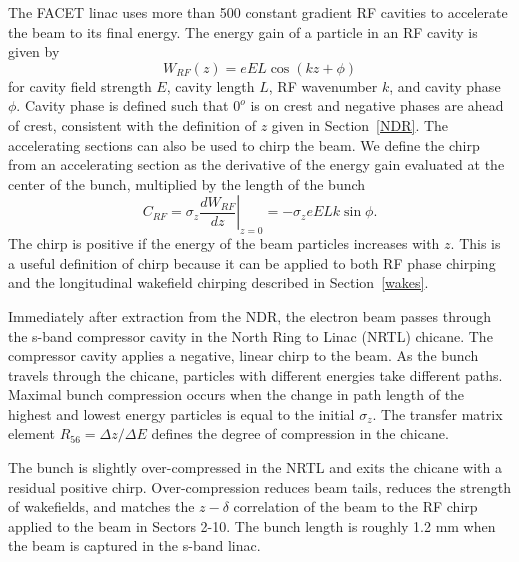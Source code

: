 \documentclass[%
twocolumn,
showpacs,preprintnumbers,
 aps,
prstab,
]{revtex4-1}
\begin{document}
The FACET linac uses more than 500 constant gradient RF cavities to accelerate the beam to its final energy. The energy gain of a particle in an RF cavity is given by
\begin{equation}
W_{RF}(z) = e E L \cos(kz + \phi)
\end{equation}
for cavity field strength $E$, cavity length $L$, RF wavenumber $k$, and cavity phase $\phi$. Cavity phase is defined such that $0^o$ is on crest and negative phases are ahead of crest, consistent with the definition of $z$ given in Section~\ref{NDR}. The accelerating sections can also be used to chirp the beam. We define the chirp from an accelerating section as the derivative of the energy gain evaluated at the center of the bunch, multiplied by the length of the bunch
\begin{equation}
C_{RF} = \sigma_z \left. \frac{dW_{RF}}{dz} \right|_{z=0} = -\sigma_z e E L k \sin{\phi}.
\end{equation}
The chirp is positive if the energy of the beam particles increases with $z$. This is a useful definition of chirp because it can be applied to both RF phase chirping and the longitudinal wakefield chirping described in Section~\ref{wakes}.

Immediately after extraction from the NDR, the electron beam passes through the s-band compressor cavity in the North Ring to Linac (NRTL) chicane. The compressor cavity applies a negative, linear chirp to the beam. As the bunch travels through the chicane, particles with different energies take different paths. Maximal bunch compression occurs when the change in path length of the highest and lowest energy particles is equal to the initial $\sigma_z$. The transfer matrix element $R_{56} = \Delta z/\Delta E$ defines the degree of compression in the chicane.

The bunch is slightly over-compressed in the NRTL and exits the chicane with a residual positive chirp. Over-compression reduces beam tails, reduces the strength of wakefields, and matches the $z-\delta$ correlation of the beam to the RF chirp applied to the beam in Sectors 2-10. The bunch length is roughly 1.2 mm when the beam is captured in the s-band linac.

\end{document}
